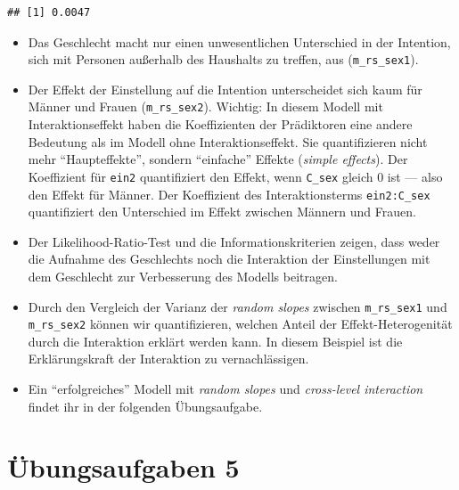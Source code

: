 \documentclass[
]{book}
\providecommand{\tightlist}{%
  \setlength{\itemsep}{0pt}\setlength{\parskip}{0pt}}
\begin{document}
\begin{verbatim}
## [1] 0.0047
\end{verbatim}

\begin{itemize}
\tightlist
\item
  Das Geschlecht macht nur einen unwesentlichen Unterschied in der Intention, sich mit Personen außerhalb des Haushalts zu treffen, aus (\texttt{m\_rs\_sex1}).
\item
  Der Effekt der Einstellung auf die Intention unterscheidet sich kaum für Männer und Frauen (\texttt{m\_rs\_sex2}). Wichtig: In diesem Modell mit Interaktionseffekt haben die Koeffizienten der Prädiktoren eine andere Bedeutung als im Modell ohne Interaktionseffekt. Sie quantifizieren nicht mehr ``Haupteffekte'', sondern ``einfache'' Effekte (\emph{simple effects}). Der Koeffizient für \texttt{ein2} quantifiziert den Effekt, wenn \texttt{C\_sex} gleich 0 ist --- also den Effekt für Männer. Der Koeffizient des Interaktionsterms \texttt{ein2:C\_sex} quantifiziert den Unterschied im Effekt zwischen Männern und Frauen.
\item
  Der Likelihood-Ratio-Test und die Informationskriterien zeigen, dass weder die Aufnahme des Geschlechts noch die Interaktion der Einstellungen mit dem Geschlecht zur Verbesserung des Modells beitragen.
\item
  Durch den Vergleich der Varianz der \emph{random slopes} zwischen \texttt{m\_rs\_sex1} und \texttt{m\_rs\_sex2} können wir quantifizieren, welchen Anteil der Effekt-Heterogenität durch die Interaktion erklärt werden kann. In diesem Beispiel ist die Erklärungskraft der Interaktion zu vernachlässigen.
\item
  Ein ``erfolgreiches'' Modell mit \emph{random slopes} und \emph{cross-level interaction} findet ihr in der folgenden Übungsaufgabe.
\end{itemize}

\hypertarget{uxfcbungsaufgaben-5}{%
\section{Übungsaufgaben 5}\label{uxfcbungsaufgaben-5}}
\end{document}
